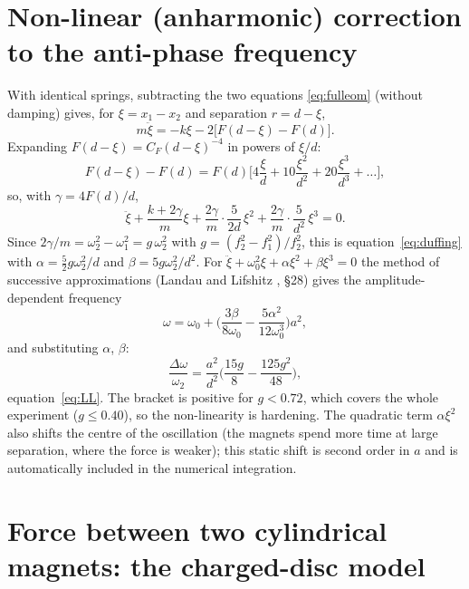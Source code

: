 \section{Non-linear (anharmonic) correction to the anti-phase frequency}\label{app:nonlinear}

With identical springs, subtracting the two equations \eqref{eq:fulleom} (without damping) gives, for $\xi=x_1-x_2$ and separation $r=d-\xi$,
\begin{equation}
m\ddot\xi=-k\xi-2\big[F(d-\xi)-F(d)\big].
\end{equation}
Expanding $F(d-\xi)=C_F(d-\xi)^{-4}$ in powers of $\xi/d$:
\begin{equation}
F(d-\xi)-F(d)=F(d)\Big[4\frac{\xi}{d}+10\frac{\xi^2}{d^2}+20\frac{\xi^3}{d^3}+\ldots\Big],
\end{equation}
so, with $\gamma=4F(d)/d$,
\begin{equation}
\ddot\xi+\frac{k+2\gamma}{m}\xi+\frac{2\gamma}{m}\cdot\frac{5}{2d}\,\xi^2+\frac{2\gamma}{m}\cdot\frac{5}{d^2}\,\xi^3=0 .
\end{equation}
Since $2\gamma/m=\omega_2^2-\omega_1^2=g\,\omega_2^2$ with $g=(f_2^2-f_1^2)/f_2^2$, this is equation~\eqref{eq:duffing} with $\alpha=\tfrac52g\omega_2^2/d$ and $\beta=5g\omega_2^2/d^2$. For $\ddot\xi+\omega_0^2\xi+\alpha\xi^2+\beta\xi^3=0$ the method of successive approximations (Landau and Lifshitz \cite{landau}, \S28) gives the amplitude-dependent frequency
\begin{equation}
\omega=\omega_0+\Big(\frac{3\beta}{8\omega_0}-\frac{5\alpha^2}{12\omega_0^3}\Big)a^2 ,
\end{equation}
and substituting $\alpha$, $\beta$:
\begin{equation}
\frac{\Delta\omega}{\omega_2}=\frac{a^2}{d^2}\Big(\frac{15g}{8}-\frac{125g^2}{48}\Big),
\end{equation}
equation~\eqref{eq:LL}. The bracket is positive for $g<0.72$, which covers the whole experiment ($g\leq0.40$), so the non-linearity is hardening. The quadratic term $\alpha\xi^2$ also shifts the centre of the oscillation (the magnets spend more time at large separation, where the force is weaker); this static shift is second order in $a$ and is automatically included in the numerical integration.

\section[Force between two cylindrical magnets]{Force between two cylindrical magnets: the charged-disc model}\label{app:finite}

